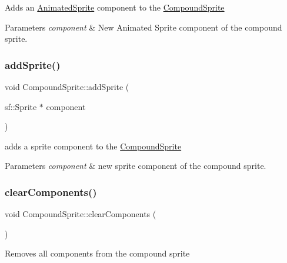 Adds an \hyperlink{class_animated_sprite}{Animated\+Sprite} component to the \hyperlink{class_compound_sprite}{Compound\+Sprite} 


\begin{DoxyParams}{Parameters}
{\em component} & New Animated Sprite component of the compound sprite.\\
\hline
\end{DoxyParams}
\mbox{\label{class_compound_sprite_a13acfc8b235bdcc0a44872476042e70d}} 
\subsubsection{\texorpdfstring{add\+Sprite()}{addSprite()}}
{\footnotesize\ttfamily void Compound\+Sprite\+::add\+Sprite (\begin{DoxyParamCaption}\item[{sf\+::\+Sprite $\ast$}]{component }\end{DoxyParamCaption})}



adds a sprite component to the \hyperlink{class_compound_sprite}{Compound\+Sprite} 


\begin{DoxyParams}{Parameters}
{\em component} & new sprite component of the compound sprite.\\
\hline
\end{DoxyParams}
\mbox{\label{class_compound_sprite_a5425526371c2c00586b757f93770edc4}} 
\subsubsection{\texorpdfstring{clear\+Components()}{clearComponents()}}
{\footnotesize\ttfamily void Compound\+Sprite\+::clear\+Components (\begin{DoxyParamCaption}{ }\end{DoxyParamCaption})}



Removes all components from the compound sprite 

\mbox{\label{class_compound_sprite_ab5cb16c085981288f84322716a7b9329}} 
